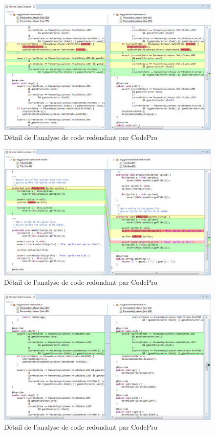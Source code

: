 \documentclass[12pt,a4paper,final]{article}
\begin{document}
\begin{figure}[ht]
	\centering
	\includegraphics[width=\textwidth]{images/SimilarCode_2.png}
	\caption{\label{SimilarCode2}Détail de l'analyse de code redondant par CodePro}
\end{figure}

\begin{figure}[ht]
	\centering
	\includegraphics[width=\textwidth]{images/SimilarCode_3.png}
	\caption{\label{SimilarCode3}Détail de l'analyse de code redondant par CodePro}
\end{figure}

\begin{figure}[ht]
	\centering
	\includegraphics[width=\textwidth]{images/SimilarCode_4.png}
	\caption{\label{SimilarCode4}Détail de l'analyse de code redondant par CodePro}
\end{figure}
\end{document}
